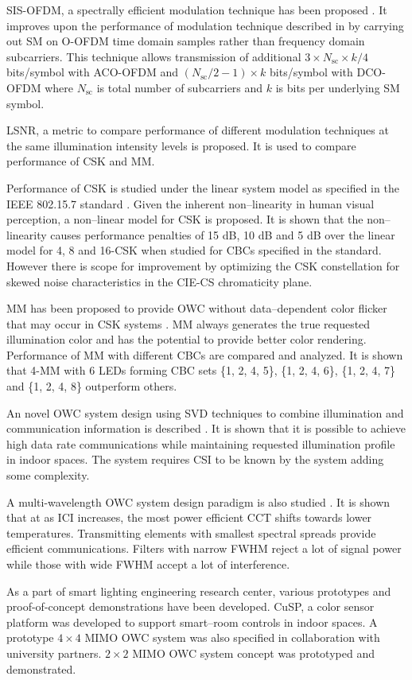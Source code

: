SIS-OFDM, a spectrally efficient modulation technique has been proposed \cite{but14b}. It improves upon the performance of modulation technique described in \cite{zha12a} by carrying out SM on O-OFDM time domain samples rather than frequency domain subcarriers. This technique allows transmission of additional $3\times N_{\text{sc}}\times k/4$ bits/symbol with ACO-OFDM and $(N_{\text{sc}}/2 - 1)\times k$ bits/symbol with DCO-OFDM where $N_{\text{sc}}$ is total number of subcarriers and $k$ is bits per underlying SM symbol.

LSNR, a metric to compare performance of different modulation techniques at the same illumination intensity levels is proposed. It is used to compare performance of CSK and MM.

Performance of CSK is studied under the linear system model as specified in the IEEE 802.15.7 standard \cite{IEEE802.15.7}. Given the inherent non--linearity in human visual perception, a non--linear model for CSK is proposed. It is shown that the non--linearity causes performance penalties of 15 dB, 10 dB and 5 dB over the linear model for 4, 8 and 16-CSK when studied for CBCs specified in the standard. However there is scope for improvement by optimizing the CSK constellation for skewed noise characteristics in the CIE-CS chromaticity plane.

MM has been proposed to provide OWC without data--dependent color flicker that may occur in CSK systems \cite{but12a}. MM always generates the true requested illumination color and has the potential to provide better color rendering. Performance of MM with different CBCs are compared and analyzed. It is shown that 4-MM with 6 LEDs forming CBC sets \{1, 2, 4, 5\}, \{1, 2, 4, 6\}, \{1, 2, 4, 7\} and \{1, 2, 4, 8\} outperform others.

An novel OWC system design using SVD techniques to combine illumination and communication information is described \cite{but13a}. It is shown that it is possible to achieve high data rate communications while maintaining requested illumination profile in indoor spaces. The system requires CSI to be known by the system adding some complexity.

A multi-wavelength OWC system design paradigm is also studied \cite{but14c}. It is shown that at as ICI increases, the most power efficient CCT shifts towards lower temperatures. Transmitting elements with smallest spectral spreads provide efficient communications. Filters with narrow FWHM reject a lot of signal power while those with wide FWHM accept a lot of interference.

As a part of smart lighting engineering research center, various prototypes and proof-of-concept demonstrations have been developed. CuSP, a color sensor platform was developed to support smart--room controls in indoor spaces. A prototype $4\times 4$ MIMO OWC system was also specified in collaboration with university partners. $2\times 2$ MIMO OWC system concept was prototyped and demonstrated.